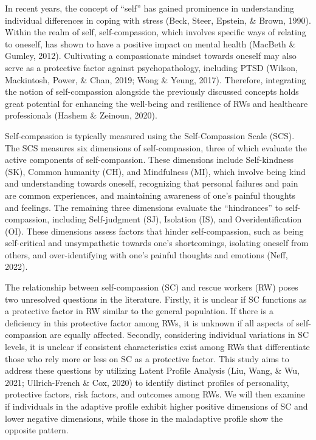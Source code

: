 \documentclass[
  man]{apa6}
\begin{document}
In recent years, the concept of ``self'' has gained prominence in understanding individual differences in coping with stress (Beck, Steer, Epstein, \& Brown, 1990). Within the realm of self, self-compassion, which involves specific ways of relating to oneself, has shown to have a positive impact on mental health (MacBeth \& Gumley, 2012). Cultivating a compassionate mindset towards oneself may also serve as a protective factor against psychopathology, including PTSD (Wilson, Mackintosh, Power, \& Chan, 2019; Wong \& Yeung, 2017). Therefore, integrating the notion of self-compassion alongside the previously discussed concepts holds great potential for enhancing the well-being and resilience of RWs and healthcare professionals (Hashem \& Zeinoun, 2020).

Self-compassion is typically measured using the Self-Compassion Scale (SCS). The SCS measures six dimensions of self-compassion, three of which evaluate the active components of self-compassion. These dimensions include Self-kindness (SK), Common humanity (CH), and Mindfulness (MI), which involve being kind and understanding towards oneself, recognizing that personal failures and pain are common experiences, and maintaining awareness of one's painful thoughts and feelings. The remaining three dimensions evaluate the ``hindrances'' to self-compassion, including Self-judgment (SJ), Isolation (IS), and Overidentification (OI). These dimensions assess factors that hinder self-compassion, such as being self-critical and unsympathetic towards one's shortcomings, isolating oneself from others, and over-identifying with one's painful thoughts and emotions (Neff, 2022).

The relationship between self-compassion (SC) and rescue workers (RW) poses two unresolved questions in the literature. Firstly, it is unclear if SC functions as a protective factor in RW similar to the general population. If there is a deficiency in this protective factor among RWs, it is unknown if all aspects of self-compassion are equally affected. Secondly, considering individual variations in SC levels, it is unclear if consistent characteristics exist among RWs that differentiate those who rely more or less on SC as a protective factor. This study aims to address these questions by utilizing Latent Profile Analysis (Liu, Wang, \& Wu, 2021; Ullrich-French \& Cox, 2020) to identify distinct profiles of personality, protective factors, risk factors, and outcomes among RWs. We will then examine if individuals in the adaptive profile exhibit higher positive dimensions of SC and lower negative dimensions, while those in the maladaptive profile show the opposite pattern.
\end{document}

